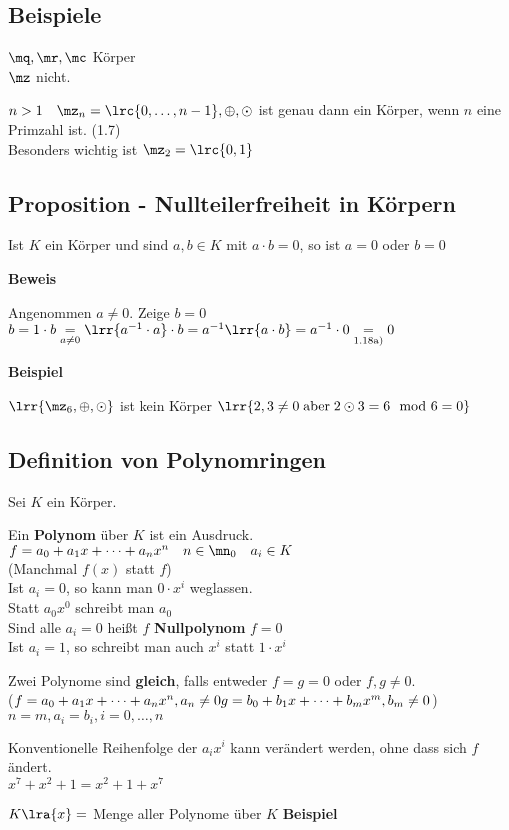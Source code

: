 \subsection{Beispiele}
		\item $\mq,\mr,\mc$ Körper\\
			$\mz$ nicht.
		\item $n>1\quad\mz_n=\lrc{0,\dots,n-1},\oplus,\odot$ ist genau dann ein Körper, wenn $n$ eine Primzahl ist. (1.7)\\
			Besonders wichtig ist $\mz_2=\lrc{0,1}$
	\subExEnd
\subsection{Proposition - Nullteilerfreiheit in Körpern}
	Ist $K$ ein Körper und sind $a,b\in K$ mit $a\cdot b=0$, so ist $a=0$ oder $b=0$

	\textbf{Beweis}

	Angenommen $a\neq 0$. Zeige $b=0$\\
	$b=1\cdot b \underset{a\neq 0}{=} \lrr{a^{-1}\cdot a}\cdot b=a^{-1}\lrr{a\cdot b}=a^{-1}\cdot 0\underset{\mbox{\scriptsize 1.18a)}}{=}0$

	\textbf{Beispiel}

	$\lrr{\mz_6,\oplus,\odot}$ ist kein Körper $\lrr{2,3\neq 0 \;\mbox{aber}\; 2\odot 3=6\mod 6 =0}$
\subsection{Definition von Polynomringen}
	Sei $K$ ein Körper.
		\item Ein \textbf{Polynom} über $K$ ist ein Ausdruck.\\
			$f=a_0+a_1x+\dots+a_nx^n\quad n\in\mn_0\quad a_i\in K$\\
			(Manchmal $f(x)$ statt $f$)\\
			Ist $a_i=0$, so kann man $0\cdot x^i$ weglassen.\\
			Statt $a_0x^0$ schreibt man $a_0$\\
			Sind alle $a_i=0$ heißt $f$ \textbf{Nullpolynom} $f=0$\\
			Ist $a_i = 1$, so schreibt man auch $x^i$ statt $1\cdot x^i$
		\item Zwei Polynome sind \textbf{gleich}, falls entweder $f=g=0$ oder $f,g\neq 0$.\\
      ($f=a_0+a_1x+\dots+a_nx^n,a_n\neq 0\\
      g=b_0+b_1x+\dots+b_mx^m,b_m\neq 0$)\\
			$n=m, a_i=b_i, i=0,\dots,n$
		\item Konventionelle Reihenfolge der $a_ix^i$ kann verändert werden, ohne dass sich $f$ ändert.\\
			$x^7+x^2+1=x^2+1+x^7$
		\item $K\lra{x}=$ Menge aller Polynome über $K$
	\subExEnd
	\textbf{Beispiel}

